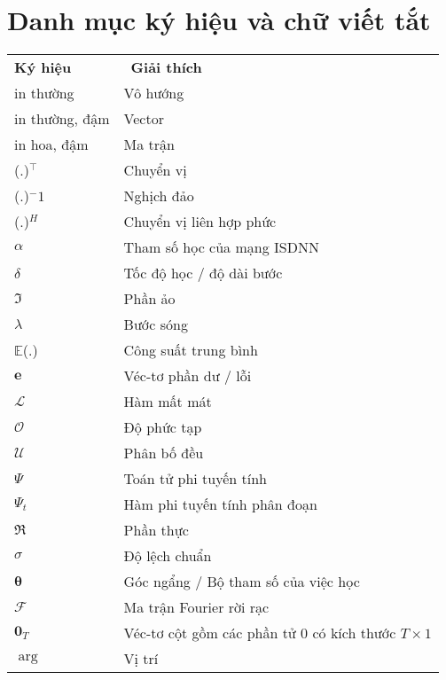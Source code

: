 \clearpage
{}

\chapter*{Danh mục ký hiệu và chữ viết tắt}
{\renewcommand{\arraystretch}{1.4}
{\fontsize{12}{13}\selectfont
\begin{longtable}{|>{\raggedright}p{4.4cm}|p{10.4cm}|}
\hline
\multicolumn{2}{|l|}{\textbf{Danh mục ký hiệu}} \\ 
\hline
\hline
\textbf{Ký hiệu} & ~\textbf{Giải thích}~ \\ 
\hline
in thường & Vô hướng \\ 
\hline
in thường, đậm & Vector \\ 
\hline
in hoa, đậm & Ma trận \\ 
\hline
(.)$^\top$ & Chuyển vị \\ 
\hline
(.)$^-1$ & Nghịch đảo \\ 
\hline
(.)$^H$ & Chuyển vị liên hợp phức \\ 
\hline
$\alpha$ & Tham số học của mạng ISDNN \\ 
\hline
$\delta$ & Tốc độ học / độ dài bước \\ 
\hline
$\Im$ & Phần ảo \\ 
\hline
$\lambda$ & Bước sóng \\ 
\hline
$\mathbb{E}$(.) & Công suất trung bình \\ 
\hline
$\mathbf{e}$ & Véc-tơ phần dư / lỗi \\ 
\hline
$\mathcal{L}$ & Hàm mất mát \\ 
\hline
$\mathcal{O}$ & Độ phức tạp \\ 
\hline
$\mathcal{U}$ & Phân bố đều \\ 
\hline
$\Psi$ & Toán tử phi tuyến tính \\ 
\hline
$\Psi_t$ & Hàm phi tuyến tính phân đoạn \\ 
\hline
$\Re$ & Phần thực \\ 
\hline
$\sigma$ & Độ lệch chuẩn \\ 
\hline
$\mathbf{\theta}$ & Góc ngẩng / Bộ tham số của việc học \\ 
\hline
$\mathcal{F}$ & Ma trận Fourier rời rạc \\ 
\hline
$\mathbf{0}_T$ & Véc-tơ cột gồm các phần tử $0$ có kích thước $T \times 1$ \\ 
\hline
$\operatorname{arg}$ & Vị trí \\ 

\end{longtable}}}
